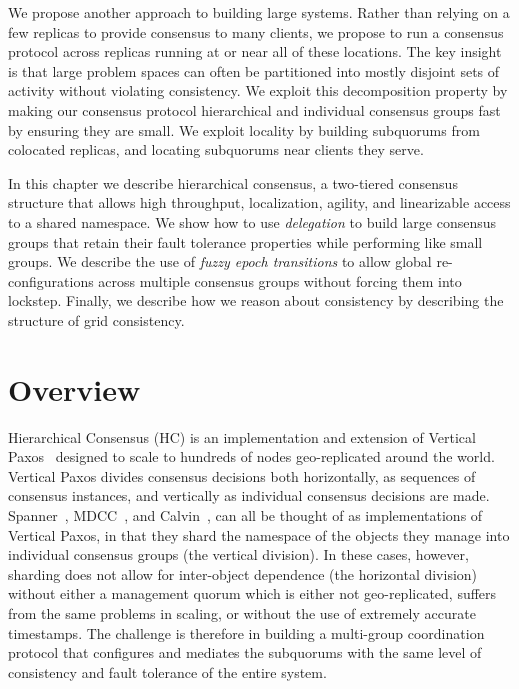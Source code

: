 
We propose another approach to building large systems.
Rather than relying on a few replicas to provide consensus to many clients, we propose to run a consensus protocol across replicas running at or near all of these locations.
The key insight is that large problem spaces can often be partitioned into mostly disjoint sets of activity without violating consistency.
We exploit this decomposition property by making our consensus protocol hierarchical and individual consensus groups fast by ensuring they are small.
We exploit locality by building subquorums from colocated replicas, and locating subquorums near clients they serve.

In this chapter we describe hierarchical consensus, a two-tiered consensus structure that allows high throughput, localization, agility, and linearizable access to a shared namespace. We show how to use \emph{delegation} to build large consensus groups that retain their fault tolerance properties while performing like small groups. We describe the use of \emph{fuzzy epoch transitions} to allow global re-configurations across multiple consensus groups without forcing them into lockstep. Finally, we describe how we reason about consistency by describing the structure of grid consistency.

\section{Overview}

Hierarchical Consensus (HC) is an implementation and extension of Vertical Paxos~\cite{vertical_paxos,boxwood,niobe} designed to scale to hundreds of nodes geo-replicated around the world.
Vertical Paxos divides consensus decisions both horizontally, as sequences of consensus instances, and vertically as individual consensus decisions are made.
Spanner~\cite{spanner}, MDCC~\cite{mdcc}, and Calvin~\cite{calvindb}, can all be thought of as implementations of Vertical Paxos, in that they shard the namespace of the objects they manage into individual consensus groups (the vertical division).
In these cases, however, sharding does not allow for inter-object dependence (the horizontal division) without either a management quorum which is either not geo-replicated, suffers from the same problems in scaling, or without the use of extremely accurate timestamps.
The challenge is therefore in building a multi-group coordination protocol that configures and mediates the subquorums with the same level of consistency and fault tolerance of the entire system.

